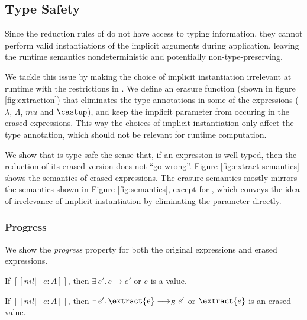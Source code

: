 \subsection{Type Safety}
\label{sec:type-safety}

Since the reduction rules of \name do not have access to typing information, they
cannot perform valid instantiations of the implicit arguments during application,
leaving the runtime semantics nondeterministic and potentially non-type-preserving.

We tackle this issue by making the choice of implicit instantiation
irrelevant at runtime with the restrictions in .
We define an erasure function (shown in figure \ref{fig:extraction})
that eliminates the type annotations
in some of the expressions ($\lambda$, $\Lambda$, $mu$ and $\castup$),
and keep the implicit parameter from occuring in the erased expressions.
This way the choices of implicit instantiation only affect the type annotation,
which should not be relevant for runtime computation.

We show that \name is type safe the sense that,
if an expression is well-typed, then the reduction of its erased version
does not ``go wrong''. Figure \ref{fig:extract-semantics} shows the semantics of
erased expressions. The erasure semantics mostly mirrors the semantics
shown in Figure \ref{fig:semantics}, except for , which
conveys the idea of irrelevance of implicit instantiation by eliminating the
parameter directly.

\subsubsection{Progress} We show the \emph{progress} property for both the original expressions
and erased expressions.

\begin{theorem}[Progress]
    If $[[nil |- e : A]]$,
    then $\exists \, e'. \, e \longrightarrow e'$ or $e$ is a value.
\end{theorem}

\begin{theorem}
    If $[[nil |- e : A]]$,
    then $\exists \, e'. \, \extract{e} \longrightarrow_E e'$ or $\extract{e}$ is an erased value.
\end{theorem}

